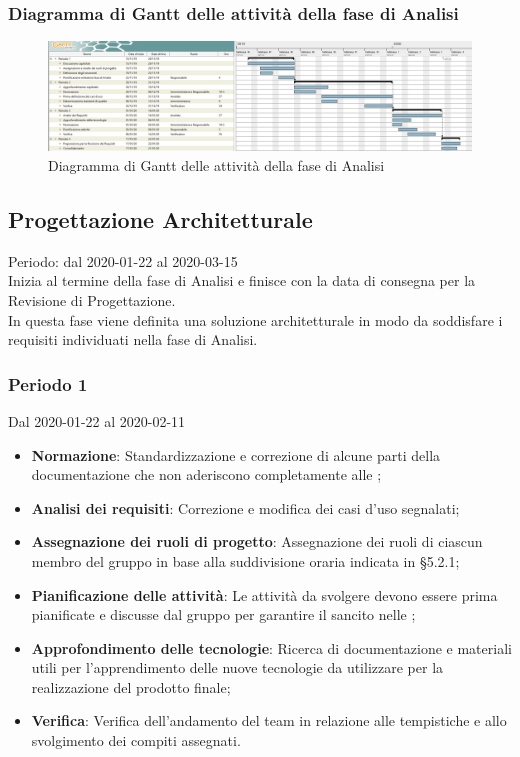 \newpage
\begin{landscape}
\subsubsection{Diagramma di Gantt delle attività della fase di Analisi}
\pagestyle{empty}
\begin{figure}[h]
	\centering	
	\includegraphics[scale=0.455]{Sezioni/DiagrammiGantt/Analisi.png}
	\caption{Diagramma di Gantt delle attività della fase di Analisi}
\end{figure}
\end{landscape}
\clearpage

\subsection{Progettazione Architetturale}
Periodo: dal 2020-01-22 al 2020-03-15\\
Inizia al termine della fase di Analisi e finisce con la data di consegna per la Revisione di Progettazione.\\
In questa fase viene definita una soluzione architetturale in modo da soddisfare i requisiti individuati nella fase di Analisi.

\subsubsection{Periodo 1} 
Dal 2020-01-22 al 2020-02-11
\begin{itemize}
	\item \textbf{Normazione}: Standardizzazione e correzione di alcune parti della documentazione che non aderiscono completamente alle \NdP{};
	\item \textbf{Analisi dei requisiti}: Correzione e modifica dei casi d'uso segnalati;
	\item \textbf{Assegnazione dei ruoli di progetto}: Assegnazione dei ruoli di ciascun membro del gruppo in base alla suddivisione oraria indicata in §5.2.1;
	\item \textbf{Pianificazione delle attività}: Le attività da svolgere devono essere prima pianificate e discusse dal gruppo per garantire il  sancito nelle \NdP{};
	\item \textbf{Approfondimento delle tecnologie}: Ricerca di documentazione e materiali utili per l'apprendimento delle nuove tecnologie da utilizzare per la realizzazione del prodotto finale;
	\item \textbf{Verifica}: Verifica dell'andamento del team in relazione alle tempistiche e allo svolgimento dei compiti assegnati.
\end{itemize}

